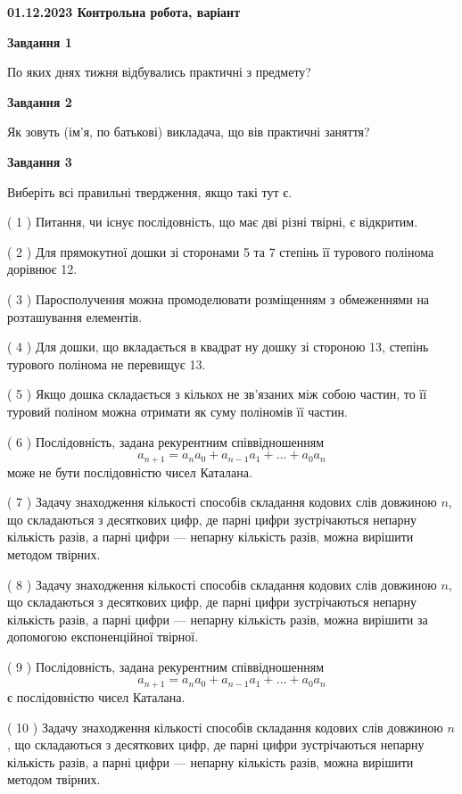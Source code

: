 \documentclass[12pt, ukrainian]{article}
\begin{document}
\begin {large}

\textbf{01.12.2023 Контрольна робота, варіант  }\par


{
{\begin {center}\textbf{Завдання 1}\end {center}}\par
По яких днях тижня відбувались практичні з предмету?\par
{\begin {center}\textbf{Завдання 2}\end {center}}\par
Як зовуть (ім'я, по батькові) викладача, що вів практичні заняття?\par
{\begin {center}\textbf{Завдання 3}\end {center}}\par
Виберіть всі правильні твердження, якщо такі тут є.\par
\vspace{2mm}
( 1 ) Питання, чи існує послідовність, що має дві різні твірні, є відкритим.%

( 2 ) Для прямокутної дошки зі сторонами 5 та 7 степінь її турового полінома дорівнює 12.%

( 3 ) Паросполучення можна промоделювати розміщенням з обмеженнями на розташування елементів.%

( 4 ) Для дошки, що вкладається в квадрат ну дошку зі стороною 13, степінь турового полінома не перевищує 13.%

( 5 ) Якщо дошка складається з кількох не зв’язаних між собою частин, то її туровий поліном можна отримати як суму поліномів її частин.%

( 6 ) Послідовність, задана рекурентним співвідношенням $$a_{n+1}=a_{n}a_{0}+a_{n-1}a_{1}+\ldots+a_0a_{n}$$ може не бути послідовністю чисел Каталана.%

( 7 ) Задачу знаходження кількості способів складання кодових слів довжиною $n$, що складаються з десяткових цифр, де парні цифри зустрічаються непарну кількість разів, а парні цифри — непарну кількість разів, можна вирішити методом твірних.%

( 8 ) Задачу знаходження кількості способів складання кодових слів довжиною $n$, що складаються з десяткових цифр, де парні цифри зустрічаються непарну кількість разів, а парні цифри — непарну кількість разів, можна вирішити за допомогою експоненційної твірної.%

( 9 ) Послідовність, задана рекурентним співвідношенням $$a_{n+1}=a_{n}a_{0}+a_{n-1}a_{1}+\ldots+a_0a_{n}$$ є послідовністю чисел Каталана.%

( 10 ) Задачу знаходження кількості способів складання кодових слів довжиною $n$, що складаються з десяткових цифр, де парні цифри зустрічаються непарну кількість разів, а парні цифри — непарну кількість разів, можна вирішити методом твірних.%
}
\end {large}

\vspace{4mm}
\newpage
\end{document}
